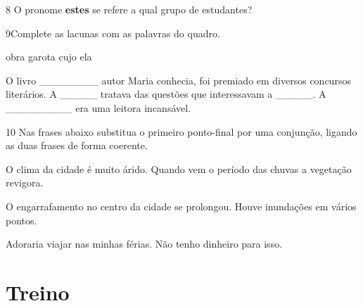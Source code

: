 \num{8} O pronome \textbf{estes} se refere a qual grupo de estudantes?


\num{9}Complete as lacunas com as palavras do quadro.

\begin{myquote}

obra garota cujo  ela

\end{myquote}

O livro \_\_\_\_\_\_\_\_ autor Maria conhecia, foi premiado em diversos
concursos literários. A \_\_\_\_\_ tratava das questões que interessavam
a \_\_\_\_\_. A \_\_\_\_\_\_\_\_\_ era uma leitora incansável.


\num{10} Nas frases abaixo substitua o primeiro ponto-final por uma conjunção,
ligando as duas frases de forma coerente. 

\begin{escolha}

  \item O clima da cidade é muito árido. Quando vem o período das chuvas a
  vegetação revigora.

\item{}
  
  \item O engarrafamento no centro da cidade se prolongou. Houve inundações em
  vários pontos.

\item{}
  
  \item Adoraria viajar nas minhas férias. Não tenho dinheiro para isso.

\item{}

\end{escolha}

\section*{Treino}

